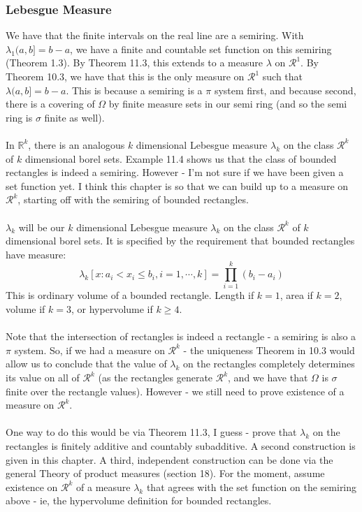 \documentclass[12pt,a4paper]{article}
\newcommand{\1}[1]{\mathbbm{1}\left\{ #1 \right\}}
\newcommand{\R}{\mathbb{R}}
\newcommand{\rcal}{\mathcal{R}}
\begin{document}
\subsubsection{Lebesgue Measure} We have that the finite intervals on the real line are a semiring. With $\lambda_1(a, b] = b - a$, we have a finite and countable set function on this semiring (Theorem 1.3). By Theorem 11.3, this extends to a measure $\lambda$ on $\rcal^1$. By Theorem 10.3, we have that this is the only measure on $\rcal^1$ such that $\lambda(a,b] = b - a$. This is because a semiring is a $\pi$ system first, and because second, there is a covering of $\Omega$ by finite measure sets in our semi ring (and so the semi ring is $\sigma$ finite as well).
\\\\
In $\R^k$, there is an analogous $k$ dimensional Lebesgue measure $\lambda_k$ on the class $\rcal^k$ of $k$ dimensional borel sets. Example 11.4 shows us that the class of bounded rectangles is indeed a semiring. However - I'm not sure if we have been given a set function yet. I think this chapter is so that we can build up to a measure on $\rcal^k$, starting off with the semiring of bounded rectangles.
\\\\
$\lambda_k$ will be our $k$ dimensional Lebesgue measure $\lambda_k$ on the class $\rcal^k$ of $k$ dimensional borel sets. It is specified by the requirement that bounded rectangles have measure:
$$
	\lambda_k\left[x : a_i < x_i \leq b_i, i = 1, \cdots, k\right] = \prod_{i=1}^k (b_i - a_i)
$$
This is ordinary volume of a bounded rectangle. Length if $k = 1$, area if $k = 2$, volume if $k = 3$, or hypervolume if $k \geq 4$.
\\\\
Note that the intersection of rectangles is indeed a rectangle - a semiring is also a $\pi$ system. So, if we had a measure on $\rcal^k$ - the uniqueness Theorem in 10.3 would allow us to conclude that the value of $\lambda_k$ on the rectangles completely determines its value on all of $\rcal^k$ (as the rectangles generate $\rcal^k$, and we have that $\Omega$ is $\sigma$ finite over the rectangle values). However - we still need to prove existence of a measure on $\rcal^k$.
\\\\
One way to do this would be via Theorem 11.3, I guess - prove that $\lambda_k$ on the rectangles is finitely additive and countably subadditive. A second construction is given in this chapter. A third, independent construction can be done via the general Theory of product measures (section 18). For the moment, assume existence on $\rcal^k$ of a measure $\lambda_k$ that agrees with the set function on the semiring above - ie, the hypervolume definition for bounded rectangles.
\end{document}
